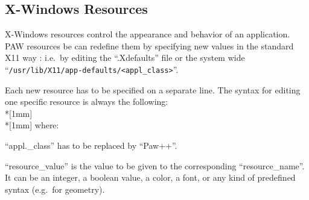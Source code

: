  
\subsection{X-Windows Resources}
\label{ref:rekmres}

X-Windows resources control the appearance and behavior of an application.
PAW resources 
be can redefine them 
by specifying new values in the standard X11 way : i.e.\ by editing
the ``.Xdefaults'' file or the system wide 
``\texttt{/usr/lib/X11/app-defaults/<appl\_class>}''.

Each new resource has to be specified on a separate line. The syntax for 
editing one specific resource is always the following:
\\*[1mm]\texttt{}\\*[1mm]
where:
\begin{UL}
\item 
``appl.\_class'' has to be replaced by ``Paw++''.
\item
``resource\_value'' is the value to be given to the corresponding 
``resource\_name''. It can be an integer, a boolean value,
a color, a font, or any kind of predefined syntax (e.g.\ for geometry).
\end{UL}


